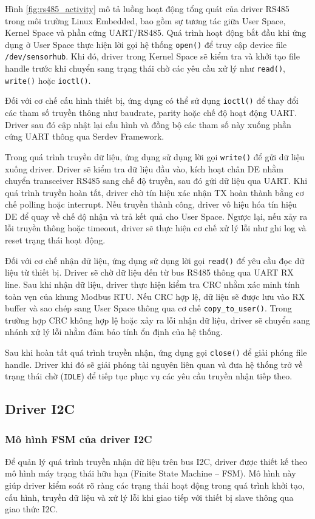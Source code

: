 Hình \ref{fig:rs485_activity} mô tả luồng hoạt động tổng quát của driver RS485 trong môi trường Linux Embedded, bao gồm sự tương tác giữa User Space, Kernel Space và phần cứng UART/RS485. Quá trình hoạt động bắt đầu khi ứng dụng ở User Space thực hiện lời gọi hệ thống \texttt{open()} để truy cập device file \texttt{/dev/sensorhub}. Khi đó, driver trong Kernel Space sẽ kiểm tra và khởi tạo file handle trước khi chuyển sang trạng thái chờ các yêu cầu xử lý như \texttt{read()}, \texttt{write()} hoặc \texttt{ioctl()}.

Đối với cơ chế cấu hình thiết bị, ứng dụng có thể sử dụng \texttt{ioctl()} để thay đổi các tham số truyền thông như baudrate, parity hoặc chế độ hoạt động UART. Driver sau đó cập nhật lại cấu hình và đồng bộ các tham số này xuống phần cứng UART thông qua Serdev Framework.

Trong quá trình truyền dữ liệu, ứng dụng sử dụng lời gọi \texttt{write()} để gửi dữ liệu xuống driver. Driver sẽ kiểm tra dữ liệu đầu vào, kích hoạt chân DE nhằm chuyển transceiver RS485 sang chế độ truyền, sau đó gửi dữ liệu qua UART. Khi quá trình truyền hoàn tất, driver chờ tín hiệu xác nhận TX hoàn thành bằng cơ chế polling hoặc interrupt. Nếu truyền thành công, driver vô hiệu hóa tín hiệu DE để quay về chế độ nhận và trả kết quả cho User Space. Ngược lại, nếu xảy ra lỗi truyền thông hoặc timeout, driver sẽ thực hiện cơ chế xử lý lỗi như ghi log và reset trạng thái hoạt động.

Đối với cơ chế nhận dữ liệu, ứng dụng sử dụng lời gọi \texttt{read()} để yêu cầu đọc dữ liệu từ thiết bị. Driver sẽ chờ dữ liệu đến từ bus RS485 thông qua UART RX line. Sau khi nhận dữ liệu, driver thực hiện kiểm tra CRC nhằm xác minh tính toàn vẹn của khung Modbus RTU. Nếu CRC hợp lệ, dữ liệu sẽ được lưu vào RX buffer và sao chép sang User Space thông qua cơ chế \texttt{copy\_to\_user()}. Trong trường hợp CRC không hợp lệ hoặc xảy ra lỗi nhận dữ liệu, driver sẽ chuyển sang nhánh xử lý lỗi nhằm đảm bảo tính ổn định của hệ thống.

Sau khi hoàn tất quá trình truyền nhận, ứng dụng gọi \texttt{close()} để giải phóng file handle. Driver khi đó sẽ giải phóng tài nguyên liên quan và đưa hệ thống trở về trạng thái chờ (\texttt{IDLE}) để tiếp tục phục vụ các yêu cầu truyền nhận tiếp theo.

\subsection{Driver I2C}
\subsubsection{Mô hình FSM của driver I2C}
Để quản lý quá trình truyền nhận dữ liệu trên bus I2C, driver được thiết kế theo mô hình máy trạng thái hữu hạn (Finite State Machine – FSM). Mô hình này giúp driver kiểm soát rõ ràng các trạng thái hoạt động trong quá trình khởi tạo, cấu hình, truyền dữ liệu và xử lý lỗi khi giao tiếp với thiết bị slave thông qua giao thức I2C.

